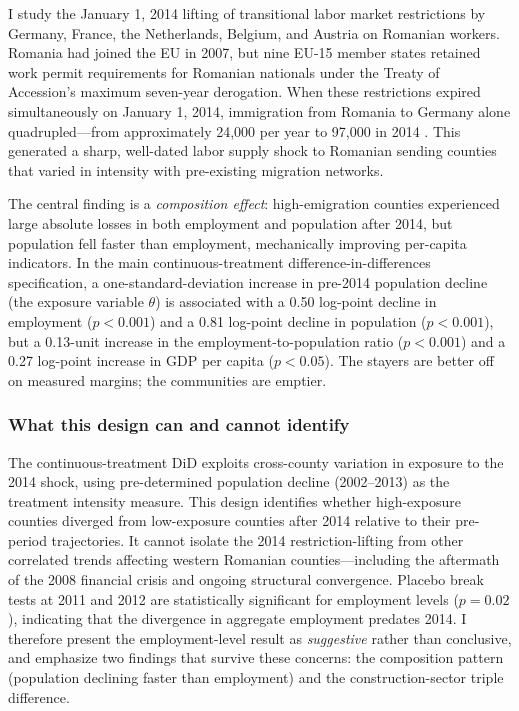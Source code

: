 \documentclass[12pt]{article}
\begin{document}
I study the January 1, 2014 lifting of transitional labor market restrictions by Germany, France, the Netherlands, Belgium, and Austria on Romanian workers. Romania had joined the EU in 2007, but nine EU-15 member states retained work permit requirements for Romanian nationals under the Treaty of Accession's maximum seven-year derogation. When these restrictions expired simultaneously on January 1, 2014, immigration from Romania to Germany alone quadrupled---from approximately 24,000 per year to 97,000 in 2014 \citep{degraaff2014FOM}. This generated a sharp, well-dated labor supply shock to Romanian sending counties that varied in intensity with pre-existing migration networks.

The central finding is a \textit{composition effect}: high-emigration counties experienced large absolute losses in both employment and population after 2014, but population fell faster than employment, mechanically improving per-capita indicators. In the main continuous-treatment difference-in-differences specification, a one-standard-deviation increase in pre-2014 population decline (the exposure variable $\theta$) is associated with a 0.50 log-point decline in employment ($p < 0.001$) and a 0.81 log-point decline in population ($p < 0.001$), but a 0.13-unit increase in the employment-to-population ratio ($p < 0.001$) and a 0.27 log-point increase in GDP per capita ($p < 0.05$). The stayers are better off on measured margins; the communities are emptier.

\subsubsection*{What this design can and cannot identify} The continuous-treatment DiD exploits cross-county variation in exposure to the 2014 shock, using pre-determined population decline (2002--2013) as the treatment intensity measure. This design identifies whether high-exposure counties diverged from low-exposure counties after 2014 relative to their pre-period trajectories. It cannot isolate the 2014 restriction-lifting from other correlated trends affecting western Romanian counties---including the aftermath of the 2008 financial crisis and ongoing structural convergence. Placebo break tests at 2011 and 2012 are statistically significant for employment levels ($p = 0.02$), indicating that the divergence in aggregate employment predates 2014. I therefore present the employment-level result as \textit{suggestive} rather than conclusive, and emphasize two findings that survive these concerns: the composition pattern (population declining faster than employment) and the construction-sector triple difference.
\end{document}
